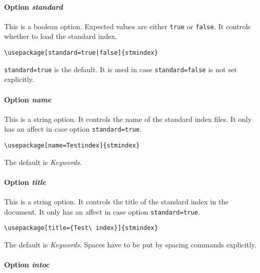 \documentclass{scrartcl}
\begin{document}
\paragraph{Option \protect\textit{standard}} 
\label{sec:usage:preamble:options:standard}

This is a boolean option. Expected values are either \texttt{true} or \texttt{false}. It controls whether to load the standard index.

\begin{verbatim}
\usepackage[standard=true|false]{stmindex}
\end{verbatim}

\texttt{standard=true} is the default. It is used in case \texttt{standard=false} is not set explicitly.

\paragraph{Option \protect\textit{name}} 
\label{sec:usage:preamble:options:name}

This is a string option. It controls the name of the standard index files. It only has an affect in case option \texttt{standard=true}.

\begin{verbatim}
\usepackage[name=Testindex]{stmindex}
\end{verbatim}

The default is \textit{Keywords}.

\paragraph{Option \protect\textit{title}} 
\label{sec:usage:preamble:options:title}

This is a string option. It controls the title of the standard index in the document. It only has an affect in case option \texttt{standard=true}.

\begin{verbatim}
\usepackage[title={Test\ index}]{stmindex}
\end{verbatim}

The default is \textit{Keywords}. Spaces have to be put by spacing commands explicitly.

\paragraph{Option \protect\textit{intoc}} 
\label{sec:usage:preamble:options:intoc}
\end{document}
